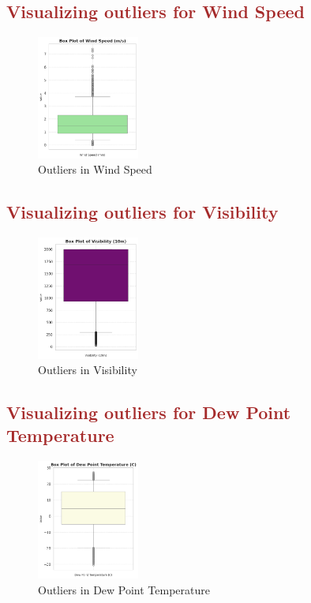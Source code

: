 \documentclass[12pt, letterpaper]{article}
\begin{document}
\newpage

\subsection*{\textcolor{brown}{Visualizing outliers for Wind Speed}}

\begin{figure}[h]
  \centering
  \includegraphics[width=0.3\textwidth]{windspeed2.png}
  \caption{Outliers in Wind Speed}
\end{figure}

\subsection*{\textcolor{brown}{Visualizing outliers for Visibility}}

\begin{figure}[h]
  \centering
  \includegraphics[width=0.3\textwidth]{visibility2.png}
  \caption{Outliers in Visibility}
\end{figure}

\newpage

\subsection*{\textcolor{brown}{Visualizing outliers for Dew Point Temperature}}

\begin{figure}[h]
  \centering
  \includegraphics[width=0.3\textwidth]{dewpoint2.png}
  \caption{Outliers in Dew Point Temperature}
\end{figure}
\end{document}
